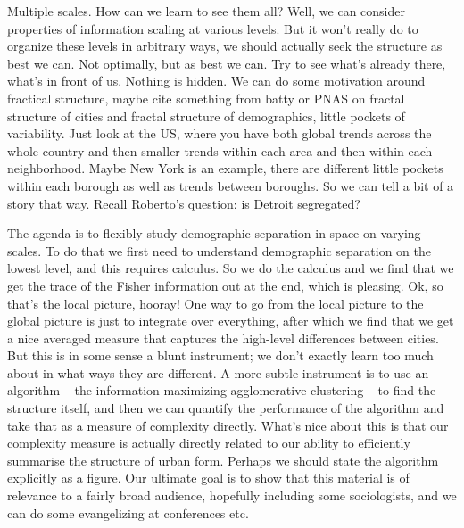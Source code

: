 \documentclass[9pt,twocolumn,twoside]{pnas-new}
\begin{document}
Multiple scales. How can we learn to see them all? Well, we can consider properties of information scaling at various levels. But it won't really do to organize these levels in arbitrary ways, we should actually seek the structure as best we can. Not optimally, but as best we can. Try to see what's already there, what's in front of us. Nothing is hidden. We can do some motivation around fractical structure, maybe cite something from batty or PNAS on fractal structure of cities and fractal structure of demographics, little pockets of variability. Just look at the US, where you have both global trends across the whole country and then smaller trends within each area and then within each neighborhood. Maybe New York is an example, there are different little pockets within each borough as well as trends between boroughs. So we can tell a bit of a story that way. Recall Roberto's question: is Detroit segregated?  

The agenda is to flexibly study demographic separation in space on varying scales. To do that we first need to understand demographic separation on the lowest level, and this requires calculus. So we do the calculus and we find that we get the trace of the Fisher information out at the end, which is pleasing. Ok, so that's the local picture, hooray! One way to go from the local picture to the global picture is just to integrate over everything, after which we find that we get a nice averaged measure that captures the high-level differences between cities. But this is in some sense a blunt instrument; we don't exactly learn too much about in what ways they are different. A more subtle instrument is to use an algorithm -- the information-maximizing agglomerative clustering -- to find the structure itself, and then we can quantify the performance of the algorithm and take that as a measure of complexity directly. What's nice about this is that our complexity measure is actually directly related to our ability to efficiently summarise the structure of urban form. Perhaps we should state the algorithm explicitly as a figure. Our ultimate goal is to show that this material is of relevance to a fairly broad audience, hopefully including some sociologists, and we can do some evangelizing at conferences etc. 
\end{document}
